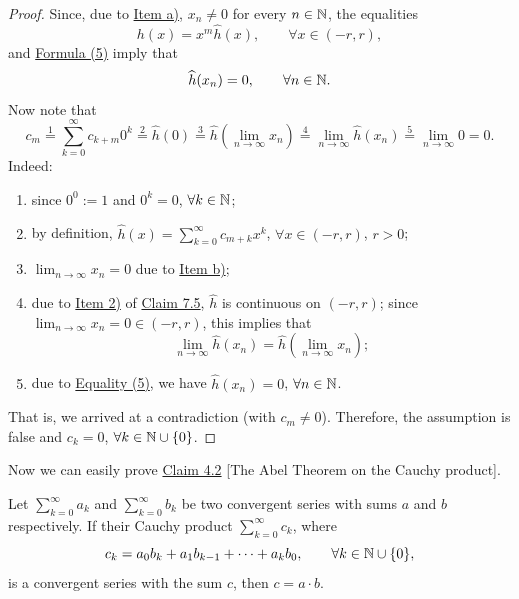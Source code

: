 \begin{proof}
Since, due to \hyperref[item:claim:7.8:a]{Item a)}, $x_n\neq0$ for every $n\in\mathbb{N}$, the equalities
\[
h(x)=x^m\widehat h(x),
\qquad \forall x\in(-r,r),
\]
and \hyperref[eq:7:5:1]{Formula (5)} imply that
\[
\widehat h(x_n)=0,
\qquad \forall n\in\mathbb{N}.
\]
Now note that
\[
c_m
\overset{1}{=}
\sum_{k=0}^{\infty}c_{k+m}0^k
\overset{2}{=}
\widehat h(0)
\overset{3}{=}
\widehat h\left(\lim_{n\to\infty}x_n\right)
\overset{4}{=}
\lim_{n\to\infty}\widehat h(x_n)
\overset{5}{=}
\lim_{n\to\infty}0
=0.
\]
Indeed:
\begin{enumerate}
    \item since $0^0:=1$ and $0^k=0$, $\forall k\in\mathbb{N}$;
    \item by definition, $\widehat h(x)=\sum_{k=0}^{\infty}c_{m+k}x^k$, $\forall x\in(-r,r)$, $r>0$;
    \item $\lim_{n\to\infty}x_n=0$ due to \hyperref[item:claim:7.8:b]{Item b)};
    \item due to \hyperref[item:claim:7.5:2]{Item 2)} of \hyperref[claim:7.5]{Claim 7.5}, $\widehat h$ is continuous on $(-r,r)$; since $\lim_{n\to\infty}x_n=0\in(-r,r)$, this implies that
    \[
    \lim_{n\to\infty}\widehat h(x_n)
    =
    \widehat h\left(\lim_{n\to\infty}x_n\right);
    \]
    \item due to \hyperref[eq:7:5:1]{Equality (5)}, we have $\widehat h(x_n)=0$, $\forall n\in\mathbb{N}$.
\end{enumerate}
That is, we arrived at a contradiction (with $c_m\neq0$).
Therefore, the assumption is false and $c_k=0$, $\forall k\in\mathbb{N}\cup\{0\}$.
\end{proof}

Now we can easily prove \hyperref[claim:4.2]{Claim 4.2} [The Abel Theorem on the Cauchy product].

\begin{claim}\label{claim:7.9}
Let $\sum_{k=0}^{\infty}a_k$ and $\sum_{k=0}^{\infty}b_k$ be two convergent series with sums $a$ and $b$ respectively.
If their Cauchy product $\sum_{k=0}^{\infty}c_k$, where
\[
c_k=a_0b_k+a_1b_{k-1}+\cdots+a_kb_0,
\qquad \forall k\in\mathbb{N}\cup\{0\},
\]
is a convergent series with the sum $c$, then $c=a\cdot b$.
\end{claim}

